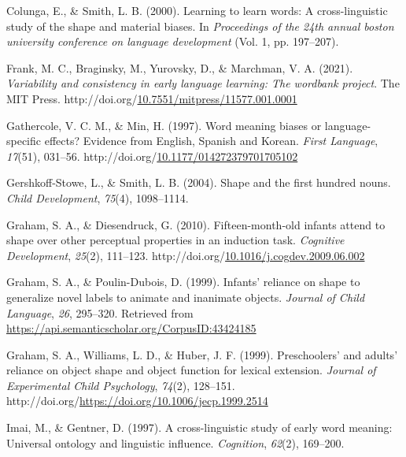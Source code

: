 \documentclass[10pt, letterpaper]{article}
\newenvironment{CSLReferences}%
  {}%
  {\par}
\begin{document}
\begin{CSLReferences}{1}{0}
\leavevmode{}%
Colunga, E., \& Smith, L. B. (2000). Learning to learn words: A
cross-linguistic study of the shape and material biases. In
\emph{Proceedings of the 24th annual boston university conference on
language development} (Vol. 1, pp. 197--207).

\leavevmode{}%
Frank, M. C., Braginsky, M., Yurovsky, D., \& Marchman, V. A. (2021).
\emph{Variability and consistency in early language learning: The
wordbank project}. The MIT Press.
http://doi.org/\href{https://doi.org/10.7551/mitpress/11577.001.0001}{10.7551/mitpress/11577.001.0001}

\leavevmode{}%
Gathercole, V. C. M., \& Min, H. (1997). Word meaning biases or
language-specific effects? {Evidence} from {English}, {Spanish} and
{Korean}. \emph{First Language}, \emph{17}(51), 031--56.
http://doi.org/\href{https://doi.org/10.1177/014272379701705102}{10.1177/014272379701705102}

\leavevmode{}%
Gershkoff-Stowe, L., \& Smith, L. B. (2004). Shape and the first hundred
nouns. \emph{Child Development}, \emph{75}(4), 1098--1114.

\leavevmode{}%
Graham, S. A., \& Diesendruck, G. (2010). Fifteen-month-old infants
attend to shape over other perceptual properties in an induction task.
\emph{Cognitive Development}, \emph{25}(2), 111--123.
http://doi.org/\href{https://doi.org/10.1016/j.cogdev.2009.06.002}{10.1016/j.cogdev.2009.06.002}

\leavevmode{}%
Graham, S. A., \& Poulin-Dubois, D. (1999). Infants' reliance on shape
to generalize novel labels to animate and inanimate objects.
\emph{Journal of Child Language}, \emph{26}, 295--320. Retrieved from
\url{https://api.semanticscholar.org/CorpusID:43424185}

\leavevmode{}%
Graham, S. A., Williams, L. D., \& Huber, J. F. (1999). Preschoolers'
and adults' reliance on object shape and object function for lexical
extension. \emph{Journal of Experimental Child Psychology},
\emph{74}(2), 128--151.
http://doi.org/\url{https://doi.org/10.1006/jecp.1999.2514}

\leavevmode{}%
Imai, M., \& Gentner, D. (1997). A cross-linguistic study of early word
meaning: Universal ontology and linguistic influence. \emph{Cognition},
\emph{62}(2), 169--200.


\end{CSLReferences}
\end{document}

